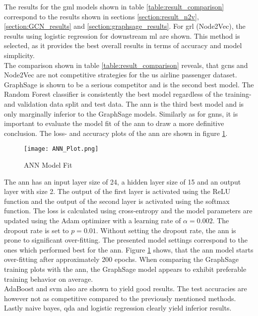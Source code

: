   \noindent The results for the \acs{gml} models shown in table 
  \ref{table:result_comparison} correspond to the results shown in sections
  \ref{section:result_n2v}, \ref{section:GCN_results} and 
  \ref{section:graphsage_results}. For \acs{grl} (Node2Vec), the results using 
  logistic regression for downstream \acs{ml} are shown. This method is selected, 
  as it provides the best overall results in terms of accuracy and model simplicity. \\

  \noindent The comparison shown in table \ref{table:result_comparison} reveals,
  that \acsp{gcn} and Node2Vec are not competitive strategies for the \acs{us} 
  airline passenger dataset. GraphSage is shown to be a serious competitor and 
  is the second best model. The Random Forest classifier is consistently the best 
  model regardless of the training- and validation data split and test data. 
  The \acs{ann} is the third best model and is only marginally inferior to the
  GraphSage models. Similarly as for \acsp{gnn}, it is important to evaluate the 
  model fit of the \acs{ann} to draw a more definitive conclusion. The loss- and
  accuracy plots of the \acs{ann} are shown in figure \ref{fig:ANN_fit}.

  \begin{figure}[h]
		\centering
		\texttt{[image: ANN\_Plot.png]}
		\caption{ANN Model Fit}
        \label{fig:ANN_fit}
  \end{figure}

  \noindent The \acs{ann} has an input layer size of 24, a hidden layer size of 
  15 and an output layer with size 2. The output of the first layer is activated
  using the ReLU function and the output of the second layer is activated
  using the softmax function. The loss is calculated using cross-entropy and
  the model parameters are updated using the Adam optimizer with a learning
  rate of $\alpha=0.002$. The dropout rate is set to $p=0.01$. Without setting 
  the dropout rate, the \acs{ann} is prone to significant over-fitting. The 
  presented model settings correspond to the ones which performed best for the 
  \acs{ann}. Figure \ref{fig:ANN_fit} shows, that the \acs{ann} model starts 
  over-fitting after approximately 200 epochs. When comparing the GraphSage 
  training plots with the \acs{ann}, the GraphSage model appears to exhibit 
  preferable training behavior on average. \\

  \noindent AdaBoost and \acs{svm} also are shown to yield good results. The test
  accuracies are however not as competitive compared to the previously
  mentioned methods. Lastly naive bayes, \acs{qda} and logistic regression clearly
  yield inferior results. 
